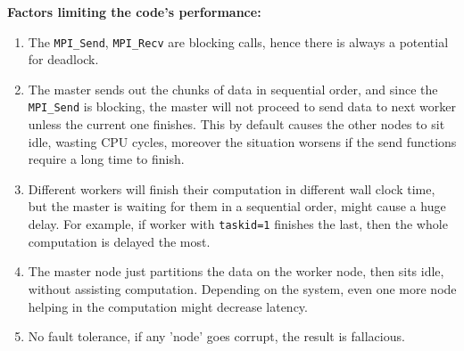 \documentclass[a4paper,12 pt]{article}
\begin{document}
\textbf{Factors limiting the code's performance:}
\begin{enumerate}
\item The \texttt{MPI\_Send}, \texttt{MPI\_Recv} are blocking calls, hence there is always a potential for deadlock.
\item The master sends out the chunks of data in sequential order, and since the \texttt{MPI\_Send} is blocking, the master will not proceed to send data to next worker unless the current one finishes. This by default causes the other nodes to sit idle, wasting CPU cycles, moreover the situation worsens if the send functions require a long time to finish.
\item Different workers will finish their computation in different wall clock time, but the master is waiting for them in a sequential order, might cause a huge delay. For example, if worker with \texttt{taskid=1} finishes the last, then the whole computation is delayed the most.
\item The master node just partitions the data on the worker node, then sits idle, without assisting computation. Depending on the system, even one more node helping in the computation might decrease latency.
\item No fault tolerance, if any 'node' goes corrupt, the result is fallacious.
\end{enumerate}
\end{document}
